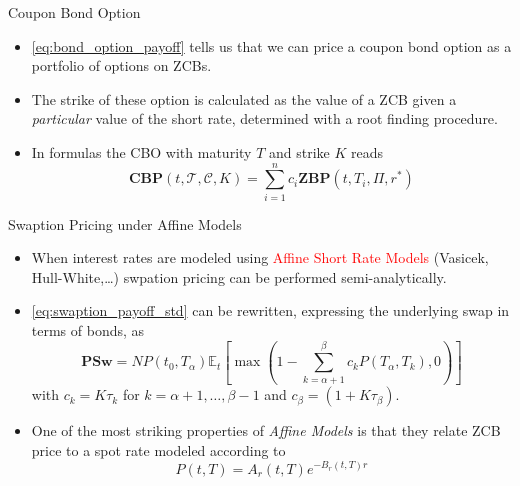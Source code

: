 \documentclass{beamer}
\begin{document}
\begin{frame}{Coupon Bond Option}
\begin{itemize}
	\item \cref{eq:bond_option_payoff} tells us that we can price a coupon bond option as a portfolio of options on ZCBs.
	\item The strike of these option is calculated as the value of a ZCB given a \emph{particular} value of the short rate, determined with a root finding procedure.
	\item In formulas the CBO with maturity $T$ and strike $K$ reads
	\begin{equation}
		\boxed{\textbf{CBP}(t,\mathcal{T},\mathcal{C},K) = \sum_{i=1}^n c_i \textbf{ZBP}(t,T_i,\Pi,r^*)}
	\end{equation}
\end{itemize}
\end{frame}

\begin{frame}{Swaption Pricing under Affine Models}
\begin{itemize}
	\item When interest rates are modeled using \textcolor{red}{Affine Short Rate Models} (Vasicek, Hull-White,\ldots) swpation pricing can be performed semi-analytically.
	\item \cref{eq:swaption_payoff_std} can be rewritten, expressing the underlying swap in terms of bonds, as
\begin{equation*}
\textbf{PSw}=NP(t_0, T_\alpha)\mathbb{E}_t\left[\max\left(1-\sum_{k=\alpha+1}^\beta c_kP(T_\alpha,T_k), 0\right)\right]
\end{equation*}
with $c_k=K\tau_k$ for $k=\alpha+1,\ldots,\beta-1$ and $c_\beta=(1+K\tau_\beta)$.
	\item One of the most striking properties of \emph{Affine Models} is that they relate ZCB price to a spot rate modeled according to 
	\begin{equation*}
		P(t,T) = A_r(t,T)e^{-B_r(t,T)r}
	\end{equation*} 
\end{itemize}
\end{frame}
\end{document}
